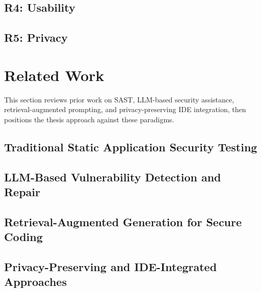 \subsection{R4: Usability}\vspace{-2mm}


\subsection{R5: Privacy}\vspace{-2mm}



\section{Related Work}
\label{sec:related-work}

This section reviews prior work on SAST, LLM-based security assistance, retrieval-augmented prompting, and privacy-preserving IDE integration, then positions the thesis approach against these paradigms.

\subsection{Traditional Static Application Security Testing}\vspace{-2mm}


\subsection{LLM-Based Vulnerability Detection and Repair}\vspace{-2mm}


\subsection{Retrieval-Augmented Generation for Secure Coding}\vspace{-2mm}


\subsection{Privacy-Preserving and IDE-Integrated Approaches}\vspace{-2mm}


